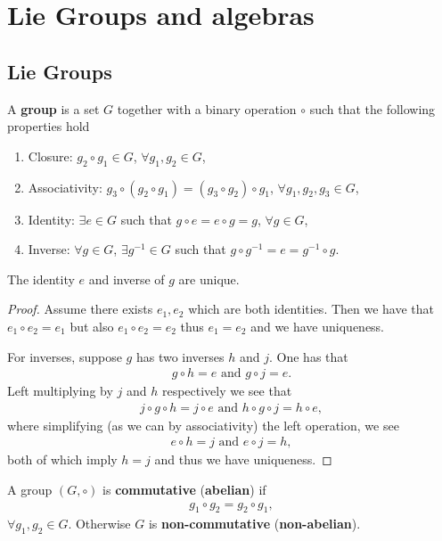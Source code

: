\section{Lie Groups and algebras}

\subsection{Lie Groups}

\begin{definition}
    A \textbf{group} is a set $G$ together with a binary operation $\circ$ such that the following properties hold
    \begin{enumerate}[label=\roman*)]
        \item Closure: $g_2 \circ g_1 \in G$, $\forall g_1, g_2 \in G$,
        \item Associativity: $g_3 \circ \left( g_2 \circ g_1 \right) = \left( g_3 \circ g_2 \right)  \circ g_1$, $\forall g_1, g_2, g_3 \in G$,
        \item Identity: $\exists e \in G$ such that $g \circ e = e \circ g = g$, $\forall g \in G$,
        \item Inverse: $\forall g \in G$, $\exists g^{-1} \in G$ such that $g \circ g^{-1} = e = g^{-1} \circ g$.
    \end{enumerate}
\end{definition}

The identity $e$ and inverse of $g$ are unique.

\begin{proof}
    Assume there exists $e_1, e_2$ which are both identities. Then we have that
    $e_1 \circ e_2 = e_1$ but also $e_1 \circ e_2 = e_2$ thus $e_1 = e_2$ and we have uniqueness. 

    For inverses, suppose $g$ has two inverses $h$ and $j$. One has that
    \begin{align}
        g \circ h = e \text{~and~} g \circ j = e
    .\end{align}
    Left multiplying by $j$ and $h$ respectively we see that
    \begin{align}
       j \circ g \circ h = j \circ e \text{~and~} h \circ g \circ j = h \circ e
    ,\end{align}
    where simplifying (as we can by associativity) the left operation, we see
    \begin{align}
        e \circ h = j \text{~and~} e \circ j = h
    ,\end{align}
    both of which imply $h = j$ and thus we have uniqueness.
\end{proof}

\begin{definition}
    A group $\left( G, \circ \right) $ is \textbf{commutative} (\textbf{abelian}) if
    \begin{align}
        g_1 \circ g_2 = g_2 \circ g_1
    ,\end{align}
    $\forall g_1, g_2 \in G$. Otherwise $G$ is \textbf{non-commutative} (\textbf{non-abelian}).
\end{definition}





